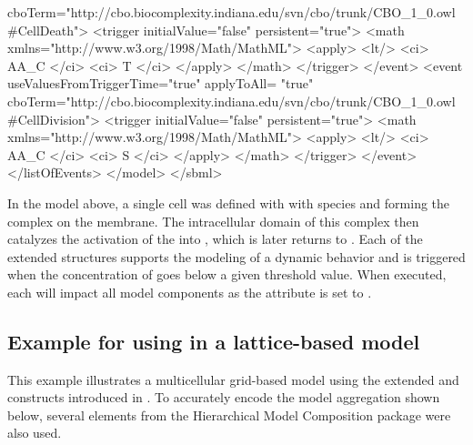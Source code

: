 \begin{example}
			       cboTerm="http://cbo.biocomplexity.indiana.edu/svn/cbo/trunk/CBO_1_0.owl#CellDeath">
				<trigger initialValue="false" persistent="true">
					<math xmlns="http://www.w3.org/1998/Math/MathML">
						<apply> <lt/> <ci> AA_C </ci> <ci> T </ci> </apply>
					</math>
				</trigger>
			</event>
			<event useValuesFromTriggerTime="true" applyToAll= "true"
			       cboTerm="http://cbo.biocomplexity.indiana.edu/svn/cbo/trunk/CBO_1_0.owl#CellDivision">
				<trigger initialValue="false" persistent="true">
					<math xmlns="http://www.w3.org/1998/Math/MathML">
						<apply> <lt/> <ci> AA_C </ci> <ci> S </ci> </apply>
					</math>
				</trigger>
			</event>	
		</listOfEvents>
	</model>
</sbml>
\end{example}

In the model above, a single cell was defined with with species  and  forming the complex  on the membrane. The intracellular domain of this complex then catalyzes the activation of the  into , which is later returns to . Each of the extended \Event structures supports the modeling of a dynamic behavior and is triggered when the concentration of  goes below a given threshold value. When executed, each \Event will impact all model components as the  attribute is set to .

\subsection{Example for using  in a lattice-based model}

This example illustrates a multicellular grid-based model using the extended \Event and \Compartment constructs introduced in . To accurately encode the model aggregation shown below, several elements from the Hierarchical Model Composition package were also used.

